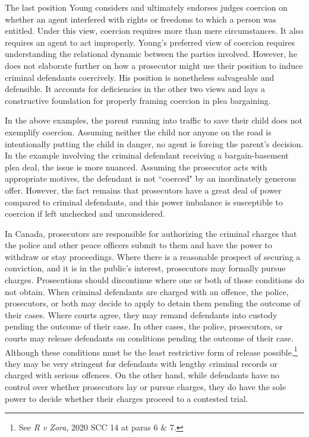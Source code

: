 The last position Young considers and ultimately endorses judges coercion on whether an agent interfered with rights or freedoms to which a person was entitled. Under this view, coercion requires more than mere circumstances. It also requires an agent to act improperly. Young's preferred view of coercion requires understanding the relational dynamic between the parties involved. However, he does not elaborate further on how a prosecutor might use their position to induce criminal defendants coercively. His position is nonetheless salvageable and defensible. It accounts for deficiencies in the other two views and lays a constructive foundation for properly framing coercion in plea bargaining.

In the above examples, the parent running into traffic to save their child does not exemplify coercion. Assuming neither the child nor anyone on the road is intentionally putting the child in danger, no agent is forcing the parent's decision. In the example involving the criminal defendant receiving a bargain-basement plea deal, the issue is more nuanced. Assuming the prosecutor acts with appropriate motives, the defendant is not ``coerced" by an inordinately generous offer. However, the fact remains that prosecutors have a great deal of power compared to criminal defendants, and this power imbalance is susceptible to coercion if left unchecked and unconsidered.

In Canada, prosecutors are responsible for authorizing the criminal charges that the police and other peace officers submit to them and have the power to withdraw or stay proceedings. Where there is a reasonable prospect of securing a conviction, and it is in the public's interest, prosecutors may formally pursue charges. Prosecutions should discontinue where one or both of those conditions do not obtain. When criminal defendants are charged with an offence, the police, prosecutors, or both may decide to apply to detain them pending the outcome of their cases. Where courts agree, they may remand defendants into custody pending the outcome of their case. In other cases, the police, prosecutors, or courts may release defendants on conditions pending the outcome of their case. Although these conditions must be the least restrictive form of release possible,\footnote{See \textit{R v Zora}, 2020 SCC 14 at paras 6 \& 7.} they may be very stringent for defendants with lengthy criminal records or charged with serious offences. On the other hand, while defendants have no control over whether prosecutors lay or pursue charges, they do have the sole power to decide whether their charges proceed to a contested trial. 

